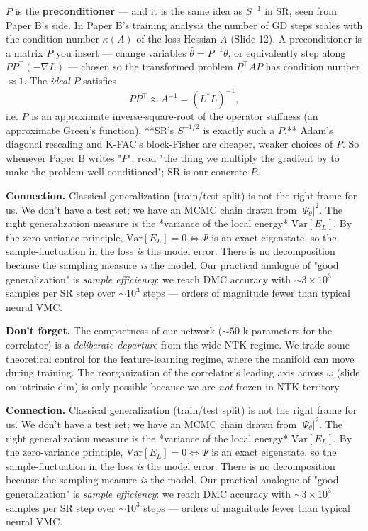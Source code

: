 \documentclass[11pt]{article}
\begin{document}
$P$ is the \textbf{preconditioner} --- and it is the same idea as $S^{-1}$ in SR,
seen from Paper B's side. In Paper B's training analysis the number of GD
steps scales with the condition number $\kappa(A)$ of the loss Hessian $A$
(Slide 12). A preconditioner is a matrix $P$ you insert --- change variables
$\hat\theta = P^{-1}\theta$, or equivalently step along $P P^\top(-\nabla
L)$ --- chosen so the transformed problem $P^\top A P$ has condition number
$\approx 1$. The \emph{ideal} $P$ satisfies
\[P P^\top \approx A^{-1} = (L^\ast L)^{-1},\]
i.e. $P$ is an approximate inverse-square-root of the operator stiffness
(an approximate Green's function). **SR's $S^{-1/2}$ is exactly such a
$P$.** Adam's diagonal rescaling and K-FAC's block-Fisher are cheaper,
weaker choices of $P$. So whenever Paper B writes "$P$", read "the thing we
multiply the gradient by to make the problem well-conditioned"; SR is our
concrete $P$.

\textbf{Connection.} Classical generalization (train/test split) is not the
right frame for us. We don't have a test set; we have an MCMC chain drawn
from $|\Psi_\theta|^2$. The right generalization measure is the *variance
of the local energy* $\mathrm{Var}[E_L]$. By the zero-variance principle,
$\mathrm{Var}[E_L] = 0 \iff \Psi$ is an exact eigenstate, so the
sample-fluctuation in the loss \emph{is} the model error. There is no
decomposition because the sampling measure \emph{is} the model. Our practical
analogue of "good generalization" is \emph{sample efficiency}: we reach DMC
accuracy with $\sim 3 \times 10^3$ samples per SR step over $\sim 10^3$
steps --- orders of magnitude fewer than typical neural VMC.

\textbf{Don't forget.} The compactness of our network ($\sim 50$ k parameters
for the correlator) is a \emph{deliberate departure} from the wide-NTK regime.
We trade some theoretical control for the feature-learning regime, where
the manifold can move during training. The reorganization of the
correlator's leading axis across $\omega$ (slide on intrinsic dim) is only
possible because we are \emph{not} frozen in NTK territory.

\textbf{Connection.} Classical generalization (train/test split) is not the
right frame for us. We don't have a test set; we have an MCMC chain drawn
from $|\Psi_\theta|^2$. The right generalization measure is the *variance
of the local energy* $\mathrm{Var}[E_L]$. By the zero-variance principle,
$\mathrm{Var}[E_L] = 0 \iff \Psi$ is an exact eigenstate, so the
sample-fluctuation in the loss \emph{is} the model error. There is no
decomposition because the sampling measure \emph{is} the model. Our practical
analogue of "good generalization" is \emph{sample efficiency}: we reach DMC
accuracy with $\sim 3 \times 10^3$ samples per SR step over $\sim 10^3$
steps --- orders of magnitude fewer than typical neural VMC.
\end{document}
